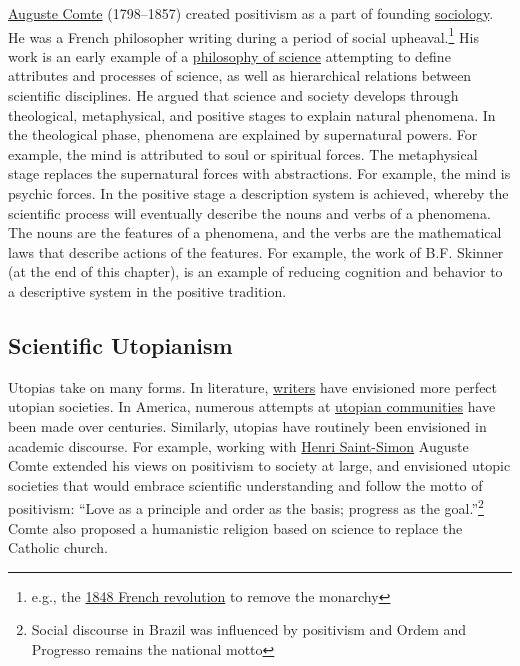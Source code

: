 \documentclass[
  oneside,
  12pt]{crumpbook}
\begin{document}
\href{https://plato.stanford.edu/entries/comte/}{Auguste Comte} (1798--1857) created positivism as a part of founding \href{https://en.wikipedia.org/wiki/Sociology}{sociology}. He was a French philosopher writing during a period of social upheaval.\footnote{e.g., the \href{https://en.wikipedia.org/wiki/Revolutions_of_1848}{1848 French revolution} to remove the monarchy} His work is an early example of a \href{https://en.wikipedia.org/wiki/Philosophy_of_science}{philosophy of science} attempting to define attributes and processes of science, as well as hierarchical relations between scientific disciplines. He argued that science and society develops through theological, metaphysical, and positive stages to explain natural phenomena. In the theological phase, phenomena are explained by supernatural powers. For example, the mind is attributed to soul or spiritual forces. The metaphysical stage replaces the supernatural forces with abstractions. For example, the mind is psychic forces. In the positive stage a description system is achieved, whereby the scientific process will eventually describe the nouns and verbs of a phenomena. The nouns are the features of a phenomena, and the verbs are the mathematical laws that describe actions of the features. For example, the work of B.F. Skinner (at the end of this chapter), is an example of reducing cognition and behavior to a descriptive system in the positive tradition.

\hypertarget{scientific-utopianism}{%
\subsection{Scientific Utopianism}\label{scientific-utopianism}}

Utopias take on many forms. In literature, \href{https://en.wikipedia.org/wiki/List_of_utopian_literature}{writers} have envisioned more perfect utopian societies. In America, numerous attempts at \href{https://en.wikipedia.org/wiki/List_of_American_utopian_communities}{utopian communities} have been made over centuries. Similarly, utopias have routinely been envisioned in academic discourse. For example, working with \href{https://en.wikipedia.org/wiki/Henri_de_Saint-Simon}{Henri Saint-Simon} Auguste Comte extended his views on positivism to society at large, and envisioned utopic societies that would embrace scientific understanding and follow the motto of positivism: ``Love as a principle and order as the basis; progress as the goal.''\footnote{Social discourse in Brazil was influenced by positivism and Ordem and Progresso remains the national motto} Comte also proposed a humanistic religion based on science to replace the Catholic church.
\end{document}
